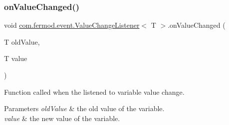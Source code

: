 \subsubsection{\texorpdfstring{onValueChanged()}{onValueChanged()}}
{\footnotesize\ttfamily void \mbox{\hyperlink{a00026}{com.\+fermod.\+event.\+Value\+Change\+Listener}}$<$ T $>$.on\+Value\+Changed (\begin{DoxyParamCaption}\item[{T}]{old\+Value,  }\item[{T}]{value }\end{DoxyParamCaption})}



Function called when the listened to variable value change. 


\begin{DoxyParams}{Parameters}
{\em old\+Value} & the old value of the variable. \\
\hline
{\em value} & the new value of the variable. \\
\hline
\end{DoxyParams}
